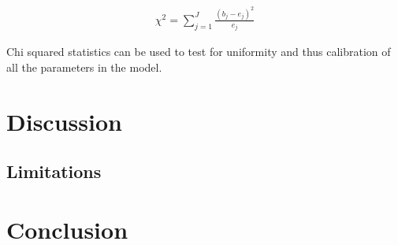 \documentclass[12pt, a4paper]{article}
\begin{document}
        $$
        \begin{aligned}
        \chi^2 = \sum_{j=1}^J \frac{(b_{j} - e_{j})^2}{e_j}
        \end{aligned}
        $$
    
        Chi squared statistics can be used to test for uniformity and thus calibration of all the parameters in the model.
    


\section{Discussion}

\subsection{Limitations}

\section{Conclusion}


\end{document}
